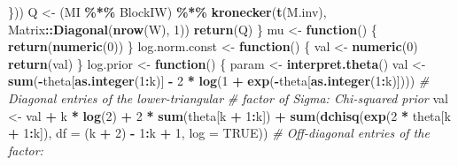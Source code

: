 \documentclass[
]{article}
\newenvironment{Shaded}{\begin{snugshade}}{\end{snugshade}}
\newcommand{\AttributeTok}[1]{\textcolor[rgb]{0.13,0.29,0.53}{#1}}
\newcommand{\CommentTok}[1]{\textcolor[rgb]{0.56,0.35,0.01}{\textit{#1}}}
\newcommand{\ConstantTok}[1]{\textcolor[rgb]{0.56,0.35,0.01}{#1}}
\newcommand{\ControlFlowTok}[1]{\textcolor[rgb]{0.13,0.29,0.53}{\textbf{#1}}}
\newcommand{\DecValTok}[1]{\textcolor[rgb]{0.00,0.00,0.81}{#1}}
\newcommand{\FunctionTok}[1]{\textcolor[rgb]{0.13,0.29,0.53}{\textbf{#1}}}
\newcommand{\NormalTok}[1]{#1}
\newcommand{\OtherTok}[1]{\textcolor[rgb]{0.56,0.35,0.01}{#1}}
\newcommand{\SpecialCharTok}[1]{\textcolor[rgb]{0.81,0.36,0.00}{\textbf{#1}}}
\begin{document}
\begin{Shaded}
\begin{Highlighting}[]
\NormalTok{        \}))}
\NormalTok{      Q }\OtherTok{\textless{}{-}}\NormalTok{ (MI }\SpecialCharTok{\%*\%}\NormalTok{ BlockIW) }\SpecialCharTok{\%*\%} \FunctionTok{kronecker}\NormalTok{(}\FunctionTok{t}\NormalTok{(M.inv), Matrix}\SpecialCharTok{::}\FunctionTok{Diagonal}\NormalTok{(}\FunctionTok{nrow}\NormalTok{(W),  }\DecValTok{1}\NormalTok{))}
      \FunctionTok{return}\NormalTok{(Q)}
\NormalTok{    \}}
\NormalTok{    mu }\OtherTok{\textless{}{-}} \ControlFlowTok{function}\NormalTok{() \{}
      \FunctionTok{return}\NormalTok{(}\FunctionTok{numeric}\NormalTok{(}\DecValTok{0}\NormalTok{))}
\NormalTok{    \}}
\NormalTok{    log.norm.const }\OtherTok{\textless{}{-}} \ControlFlowTok{function}\NormalTok{() \{}
\NormalTok{      val }\OtherTok{\textless{}{-}} \FunctionTok{numeric}\NormalTok{(}\DecValTok{0}\NormalTok{)}
      \FunctionTok{return}\NormalTok{(val)}
\NormalTok{    \}}
\NormalTok{    log.prior }\OtherTok{\textless{}{-}} \ControlFlowTok{function}\NormalTok{() \{}
\NormalTok{      param }\OtherTok{\textless{}{-}} \FunctionTok{interpret.theta}\NormalTok{()}
\NormalTok{      val }\OtherTok{\textless{}{-}} \FunctionTok{sum}\NormalTok{(}\SpecialCharTok{{-}}\NormalTok{theta[}\FunctionTok{as.integer}\NormalTok{(}\DecValTok{1}\SpecialCharTok{:}\NormalTok{k)] }\SpecialCharTok{{-}} \DecValTok{2} \SpecialCharTok{*} \FunctionTok{log}\NormalTok{(}\DecValTok{1} \SpecialCharTok{+} \FunctionTok{exp}\NormalTok{(}\SpecialCharTok{{-}}\NormalTok{theta[}\FunctionTok{as.integer}\NormalTok{(}\DecValTok{1}\SpecialCharTok{:}\NormalTok{k)])))}
      \CommentTok{\#\textquotesingle{} Diagonal entries of the lower{-}triangular}
      \CommentTok{\#\textquotesingle{} factor of Sigma: Chi{-}squared prior}
\NormalTok{      val }\OtherTok{\textless{}{-}}\NormalTok{ val }\SpecialCharTok{+}\NormalTok{ k }\SpecialCharTok{*} \FunctionTok{log}\NormalTok{(}\DecValTok{2}\NormalTok{) }\SpecialCharTok{+} \DecValTok{2} \SpecialCharTok{*} \FunctionTok{sum}\NormalTok{(theta[k }\SpecialCharTok{+} \DecValTok{1}\SpecialCharTok{:}\NormalTok{k]) }\SpecialCharTok{+} 
        \FunctionTok{sum}\NormalTok{(}\FunctionTok{dchisq}\NormalTok{(}\FunctionTok{exp}\NormalTok{(}\DecValTok{2} \SpecialCharTok{*}\NormalTok{ theta[k }\SpecialCharTok{+} \DecValTok{1}\SpecialCharTok{:}\NormalTok{k]), }
                   \AttributeTok{df =}\NormalTok{ (k }\SpecialCharTok{+} \DecValTok{2}\NormalTok{) }\SpecialCharTok{{-}} \DecValTok{1}\SpecialCharTok{:}\NormalTok{k }\SpecialCharTok{+} \DecValTok{1}\NormalTok{, }\AttributeTok{log =} \ConstantTok{TRUE}\NormalTok{))}
        \CommentTok{\#\textquotesingle{} Off{-}diagonal entries of the factor:}

\end{Highlighting}
\end{Shaded}
\end{document}
